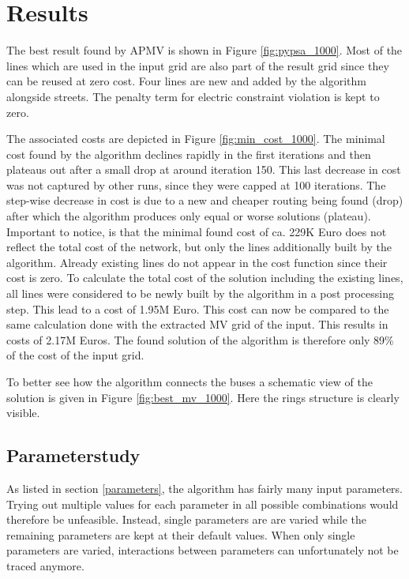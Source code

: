 %

\section{Results}



The best result found by APMV is shown in Figure \ref{fig:pypsa_1000}. Most of the lines which are used in the input grid are also part of the result grid since they can be reused at zero cost. Four lines are new and added by the algorithm alongside streets. The penalty term for electric constraint violation is kept to zero.



The associated costs are depicted in Figure \ref{fig:min_cost_1000}. The minimal cost found by the algorithm declines rapidly in the first iterations and then plateaus out after a small drop at around iteration 150. This last decrease in cost was not captured by other runs, since they were capped at 100 iterations. The step-wise decrease in cost is due to a new and cheaper routing being found (drop) after which the algorithm produces only equal or worse solutions (plateau). Important to notice, is that the minimal found cost of ca. 229K Euro does not reflect the total cost of the network, but only the lines additionally built by the algorithm. Already existing lines do not appear in the cost function since their cost is zero. To calculate the total cost of the solution including the existing lines, all lines were considered to be newly built by the algorithm in a post processing step. This lead to a cost of 1.95M Euro. This cost can now be compared to the same calculation done with the extracted MV grid of the input. This results in costs of 2.17M Euros. The found solution of the algorithm is therefore only 89\% of the cost of the input grid.




To better see how the algorithm connects the buses a schematic view of the solution is given in Figure \ref{fig:best_mv_1000}. Here the rings structure is clearly visible. 





\subsection{Parameterstudy}
As listed in section \ref{parameters}, the algorithm has fairly many input parameters. Trying out multiple values for each parameter in all possible combinations would therefore be unfeasible. Instead, single parameters are are varied while the remaining parameters are kept at their default values. When only single parameters are varied, interactions between parameters can unfortunately not be traced anymore. \\

